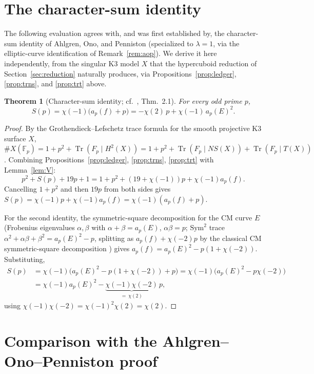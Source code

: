 \documentclass[11pt]{amsart}
\newtheorem{theorem}{Theorem}[section]
\theoremstyle{definition}
\newcommand{\Fp}{\mathbb{F}_p}
\DeclareMathOperator{\Tr}{Tr}
\begin{document}
\section{The character-sum identity}
\label{sec:main}

The following evaluation agrees with, and was first established by, the character-sum identity of Ahlgren, Ono, and Penniston \cite[Thm.\ 2.1]{AOP2002} (specialized to $\lambda=1$, via the elliptic-curve identification of Remark~\ref{rem:aop}). We derive it here independently, from the singular K3 model $X$ that the hypercuboid reduction of Section~\ref{sec:reduction} naturally produces, via Propositions~\ref{prop:ledger}, \ref{prop:trns}, and \ref{prop:trt} above.

\begin{theorem}[Character-sum identity; cf.\ \cite{AOP2002}, Thm.\ 2.1]
\label{thm:main}
For every odd prime $p$,
\[
S(p)=\chi(-1)\bigl(a_p(f)+p\bigr)=-\chi(2)\,p+\chi(-1)\,a_p(E)^2.
\]
\end{theorem}

\begin{proof}
By the Grothendieck--Lefschetz trace formula for the smooth projective K3 surface $X$, $\#X(\Fp)=1+p^2+\Tr(F_p\mid H^2(X))=1+p^2+\Tr(F_p\mid NS(X))+\Tr(F_p\mid T(X))$. Combining Propositions~\ref{prop:ledger}, \ref{prop:trns}, \ref{prop:trt} with Lemma~\ref{lem:V}:
\[
p^2+S(p)+19p+1 = 1+p^2+(19+\chi(-1))p+\chi(-1)a_p(f).
\]
Cancelling $1+p^2$ and then $19p$ from both sides gives $S(p)=\chi(-1)p+\chi(-1)a_p(f)=\chi(-1)(a_p(f)+p)$.

For the second identity, the symmetric-square decomposition for the CM curve $E$ (Frobenius eigenvalues $\alpha,\beta$ with $\alpha+\beta=a_p(E)$, $\alpha\beta=p$; $\mathrm{Sym}^2$ trace $\alpha^2+\alpha\beta+\beta^2=a_p(E)^2-p$, splitting as $a_p(f)+\chi(-2)p$ by the classical CM symmetric-square decomposition \cite{CMtheory}) gives $a_p(f)=a_p(E)^2-p(1+\chi(-2))$. Substituting,
\begin{align*}
S(p) &= \chi(-1)\bigl(a_p(E)^2-p(1+\chi(-2))+p\bigr) = \chi(-1)\bigl(a_p(E)^2-p\chi(-2)\bigr)\\
&= \chi(-1)a_p(E)^2-\underbrace{\chi(-1)\chi(-2)}_{=\,\chi(2)}\,p,
\end{align*}
using $\chi(-1)\chi(-2)=\chi(-1)^2\chi(2)=\chi(2)$.
\end{proof}

\section{Comparison with the Ahlgren--Ono--Penniston proof}
\label{sec:methods}
\end{document}
